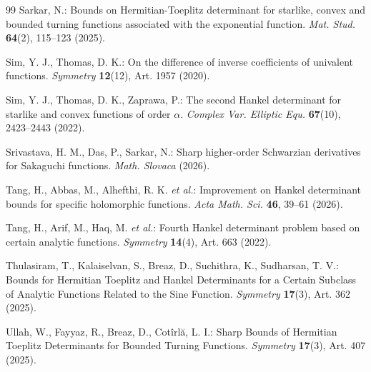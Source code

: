 \documentclass[11pt,reqno]{amsart}
\numberwithin{equation}{section}
\begin{document}
\begin{thebibliography}{99}
Sarkar, N.: 
Bounds on Hermitian-Toeplitz determinant for starlike, convex and bounded turning functions associated with the exponential function. 
\textit{Mat. Stud.} \textbf{64}(2), 115--123 (2025).

Sim, Y. J., Thomas, D. K.:
On the difference of inverse coefficients of univalent functions.
\textit{Symmetry} \textbf{12}(12), Art. 1957 (2020).

Sim, Y. J., Thomas, D. K., Zaprawa, P.:
The second Hankel determinant for starlike and convex functions of order $\alpha$.
\textit{Complex Var. Elliptic Equ.} \textbf{67}(10), 2423--2443 (2022).

Srivastava, H. M., Das, P., Sarkar, N.:
Sharp higher-order Schwarzian derivatives for Sakaguchi functions.
\textit{Math. Slovaca} (2026).

Tang, H., Abbas, M., Alhefthi, R. K. \textit{et al.}:
Improvement on Hankel determinant bounds for specific holomorphic functions.
\textit{Acta Math. Sci.} \textbf{46}, 39--61 (2026).

Tang, H., Arif, M., Haq, M. \textit{et al.}:
Fourth Hankel determinant problem based on certain analytic functions.
\textit{Symmetry} \textbf{14}(4), Art. 663 (2022).

Thulasiram, T., Kalaiselvan, S., Breaz, D., Suchithra, K., Sudharsan, T. V.: 
Bounds for Hermitian Toeplitz and Hankel Determinants for a Certain Subclass of Analytic Functions Related to the Sine Function. 
\textit{Symmetry} \textbf{17}(3), Art. 362 (2025).

Ullah, W., Fayyaz, R., Breaz, D., Cot\^{i}rl\u{a}, L. I.: 
Sharp Bounds of Hermitian Toeplitz Determinants for Bounded Turning Functions. 
\textit{Symmetry} \textbf{17}(3), Art. 407 (2025).

\end{thebibliography}
\end{document}
